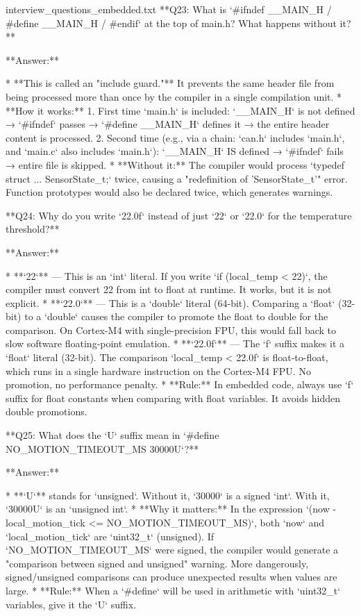 \begin{filecontents*}{interview_questions_embedded.txt}
**Q23: What is `#ifndef __MAIN_H / #define __MAIN_H / #endif` at the top of main.h? What happens without it?**

**Answer:**

* **This is called an "include guard."** It prevents the same header file from being processed more than once by the compiler in a single compilation unit.
* **How it works:**
  1. First time `main.h` is included: `__MAIN_H` is not defined → `#ifndef` passes → `#define __MAIN_H` defines it → the entire header content is processed.
  2. Second time (e.g., via a chain: `can.h` includes `main.h`, and `main.c` also includes `main.h`): `__MAIN_H` IS defined → `#ifndef` fails → entire file is skipped.
* **Without it:** The compiler would process `typedef struct { ... } SensorState_t;` twice, causing a "redefinition of 'SensorState_t'" error. Function prototypes would also be declared twice, which generates warnings.

**Q24: Why do you write `22.0f` instead of just `22` or `22.0` for the temperature threshold?**

**Answer:**

* **`22`** — This is an `int` literal. If you write `if (local_temp < 22)`, the compiler must convert 22 from int to float at runtime. It works, but it is not explicit.
* **`22.0`** — This is a `double` literal (64-bit). Comparing a `float` (32-bit) to a `double` causes the compiler to promote the float to double for the comparison. On Cortex-M4 with single-precision FPU, this would fall back to slow software floating-point emulation.
* **`22.0f`** — The `f` suffix makes it a `float` literal (32-bit). The comparison `local_temp < 22.0f` is float-to-float, which runs in a single hardware instruction on the Cortex-M4 FPU. No promotion, no performance penalty.
* **Rule:** In embedded code, always use `f` suffix for float constants when comparing with float variables. It avoids hidden double promotions.

**Q25: What does the `U` suffix mean in `#define NO_MOTION_TIMEOUT_MS 30000U`?**

**Answer:**

* **`U`** stands for `unsigned`. Without it, `30000` is a signed `int`. With it, `30000U` is an `unsigned int`.
* **Why it matters:** In the expression `(now - local_motion_tick <= NO_MOTION_TIMEOUT_MS)`, both `now` and `local_motion_tick` are `uint32_t` (unsigned). If `NO_MOTION_TIMEOUT_MS` were signed, the compiler would generate a "comparison between signed and unsigned" warning. More dangerously, signed/unsigned comparisons can produce unexpected results when values are large.
* **Rule:** When a `#define` will be used in arithmetic with `uint32_t` variables, give it the `U` suffix.


\end{filecontents*}
